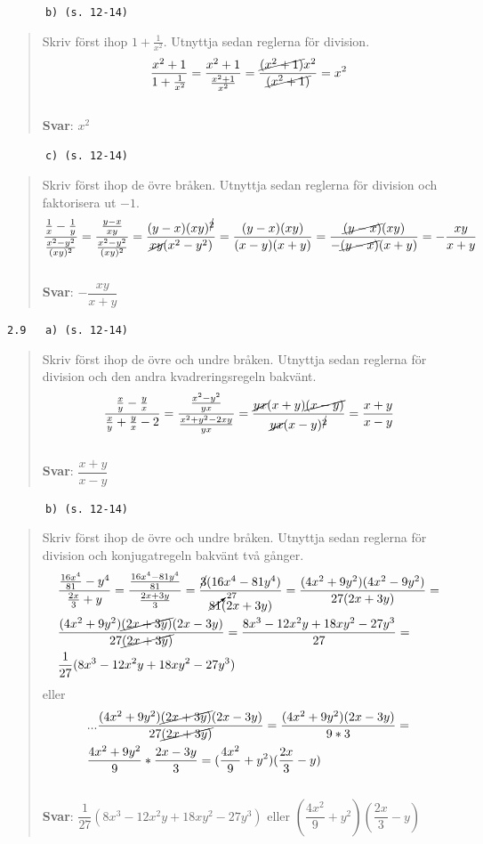 \documentclass[a4paper]{article}
\newcommand{\tskcol}[1]{\textcolor{tskcol}{#1}}
\begin{document}
	\texttt{\tskcol{~~~~~~b) (s. 12-14)}}
	\begin{quotation}
		\noindent
		Skriv först ihop $1+\frac{1}{x^2}$. Utnyttja sedan reglerna för division.
		\[\dfrac{x^2+1}{1+\frac{1}{x^2}}=
		\dfrac{x^2+1}{\frac{x^2+1}{x^2}}=
		\dfrac{\cancel{(x^2+1)}x^2}{\cancel{(x^2+1)}}=
		x^2\]
		\\
		\textbf{Svar}: $x^2$
	\end{quotation}
	
	\texttt{\tskcol{~~~~~~c) (s. 12-14)}}
	\begin{quotation}
		\noindent
		Skriv först ihop de övre bråken. Utnyttja sedan reglerna för division och faktorisera ut $-1$.
		\[\dfrac{\frac{1}{x}-\frac{1}{y}}{\frac{x^2-y^2}{(xy)^2}}=
		\dfrac{\frac{y-x}{xy}}{\frac{x^2-y^2}{(xy)^2}}=
		\dfrac{(y-x)(xy)^{\cancel{2}}}{\cancel{xy}(x^2-y^2)}=
		\dfrac{(y-x)(xy)}{(x-y)(x+y)}=
		\dfrac{\cancel{(y-x)}(xy)}{-\cancel{(y-x)}(x+y)}=
		-\dfrac{xy}{x+y}\]
		\\
		\textbf{Svar}: $-\dfrac{xy}{x+y}$
	\end{quotation}
	
	\pagebreak
	\texttt{\tskcol{2.9~~~a) (s. 12-14)}}
	\begin{quotation}
		\noindent
		Skriv först ihop de övre och undre bråken. Utnyttja sedan reglerna för division och den andra kvadreringsregeln bakvänt.
		\[\dfrac{\frac{x}{y}- \frac{y}{x}}{\frac{x}{y}+\frac{y}{x}-2}=
		\dfrac{\frac{x^2-y^2}{yx}}{\frac{x^2+y^2-2xy}{yx}}=
		\dfrac{\cancel{yx}(x+y)\cancel{(x-y)}}{\cancel{yx}(x-y)^{\cancel{2}}}=
		\dfrac{x+y}{x-y}\]
		\\
		\textbf{Svar}: $\dfrac{x+y}{x-y}$
	\end{quotation}
	
	\texttt{\tskcol{~~~~~~b) (s. 12-14)}}
	\begin{quotation}
		\noindent
		Skriv först ihop de övre och undre bråken. Utnyttja sedan reglerna för division och konjugatregeln bakvänt två gånger.
		\begin{align*}
		&\dfrac{\frac{16x^4}{81}-y^4}{\frac{2x}{3}+y}=
		\dfrac{\frac{16x^4-81y^4}{81}}{\frac{2x+3y}{3}}=
		\dfrac{\cancel{3}(16x^4-81y^4)}{\cancelto{27}{81}(2x+3y)}= 
		\dfrac{(4x^2+9y^2)(4x^2-9y^2)}{27(2x+3y)}=\\
		&\dfrac{(4x^2+9y^2)\cancel{(2x+3y)}(2x-3y)}{27\cancel{(2x+3y)}}=
		\dfrac{8x^3-12x^2y+18xy^2-27y^3}{27}= \\
		&\dfrac{1}{27}(8x^3-12x^2y+18xy^2-27y^3)
		\end{align*}
		eller
		\begin{align*}
		&...\dfrac{(4x^2+9y^2)\cancel{(2x+3y)}(2x-3y)}{27\cancel{(2x+3y)}}=
		\dfrac{(4x^2+9y^2)(2x-3y)}{9*3}= \\
		&\dfrac{4x^2+9y^2}{9}*\dfrac{2x-3y}{3}=
		(\dfrac{4x^2}{9}+y^2)(\dfrac{2x}{3}-y)
		\end{align*}
		\\
		\textbf{Svar}: $\dfrac{1}{27}(8x^3-12x^2y+18xy^2-27y^3)$ eller $(\dfrac{4x^2}{9}+y^2)(\dfrac{2x}{3}-y)$
	\end{quotation}
	
\end{document}
